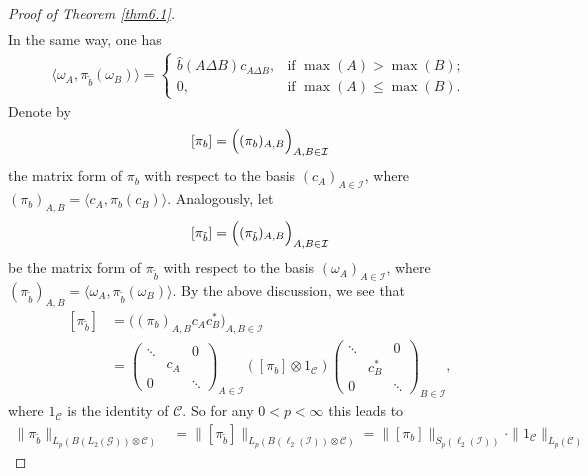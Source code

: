 \documentclass[oneside,english,a4wide]{amsart}
\numberwithin{equation}{section}
\numberwithin{figure}{section}
\theoremstyle{plain}
\theoremstyle{plain}
\theoremstyle{definition}
\theoremstyle{plain}
\theoremstyle{remark}
\theoremstyle{definition}
\theoremstyle{remark}
\theoremstyle{definition}
\newcommand{\8}{\infty}
\begin{document}
\begin{proof}[Proof of Theorem \ref{thm6.1}]
\begin{equation*}
\begin{aligned}
			\end{aligned}
		\end{equation*}
		In the same way, one has
		\begin{equation*}
			\begin{aligned}
				\langle \omega_A,\pi_{\tilde{b}} (\omega_B)\rangle=
				\begin{cases}
					\hat{b}(A\Delta B)c_{A\Delta B},& \text{if $\max (A)>\max (B)$};\\
					0,& \text{if $\max (A)\le\max (B)$}.
				\end{cases}
			\end{aligned}
		\end{equation*}
		Denote by
		\[[\pi_b]=\Bigl((\pi_b)_{A,B}\Bigr)_{A,B\in\mathcal{I}}\]
		the matrix form of $\pi_b$ with respect to the basis $(c_A)_{A\in\mathcal{I}}$, where $(\pi_b)_{A,B}=\langle c_A,\pi_b (c_B)\rangle$. Analogously, let \[[\pi_{\tilde{b}}]=\Bigl((\pi_{\tilde{b}})_{A,B}\Bigr)_{A,B\in\mathcal{I}}\]
		be the matrix form of $\pi_{\tilde{b}}$ with respect to the basis $(\omega_A)_{A\in\mathcal{I}}$, where
		$(\pi_{\tilde{b}})_{A,B}=\langle \omega_A,\pi_{\tilde{b}} (\omega_B)\rangle$. By the above discussion, we see that
		\begin{equation*}
			\begin{aligned}
				[\pi_{\tilde{b}}]{}&=\biggl((\pi_b)_{A,B}c_Ac_B^*\biggr)_{A,B\in\mathcal{I}}\\&=
				\begin{pmatrix}
					\ddots & \,  &   0 \\
					\,     & c_A &   \,\\
					0      & \,  &   \ddots
				\end{pmatrix}_{A\in\mathcal{I}}([\pi_b]\otimes 1_{\mathcal{C}})
				\begin{pmatrix}
					\ddots & \,  &   0 \\
					\,     & c_B^* &   \,\\
					0      & \,  &   \ddots
				\end{pmatrix}_{B\in\mathcal{I}},
			\end{aligned}
		\end{equation*}
		where $1_{\mathcal{C}}$ is the identity of $\mathcal{C}$. So for any $0<p<\8$ this leads to 
		\begin{equation*}
			\begin{aligned}
				\|\pi_{\tilde{b}}\|_{L_p(B(L_2(\mathcal{G}))\otimes \mathcal{C})}{}&=\|[\pi_{\tilde{b}}]\|_{L_p(B(\ell_2(\mathcal{I}))\otimes \mathcal{C})}= \|[\pi_{b}]\|_{S_p(\ell_2(\mathcal{I}))}\cdot \| 1_\mathcal{C}\|_{L_p(\mathcal{C})}

\end{aligned}
\end{equation*}
\end{proof}
\end{document}
